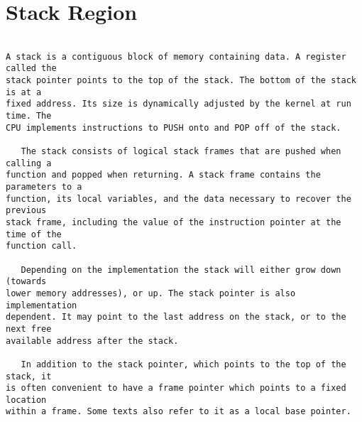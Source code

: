 \section{Stack Region}
\begin{frame}[fragile]
\begin{verbatim}

A stack is a contiguous block of memory containing data. A register called the
stack pointer points to the top of the stack. The bottom of the stack is at a
fixed address. Its size is dynamically adjusted by the kernel at run time. The
CPU implements instructions to PUSH onto and POP off of the stack. 

   The stack consists of logical stack frames that are pushed when calling a
function and popped when returning. A stack frame contains the parameters to a
function, its local variables, and the data necessary to recover the previous
stack frame, including the value of the instruction pointer at the time of the
function call.

   Depending on the implementation the stack will either grow down (towards
lower memory addresses), or up. The stack pointer is also implementation
dependent. It may point to the last address on the stack, or to the next free
available address after the stack. 

   In addition to the stack pointer, which points to the top of the stack, it
is often convenient to have a frame pointer which points to a fixed location
within a frame. Some texts also refer to it as a local base pointer.

\end{verbatim}
\end{frame}

